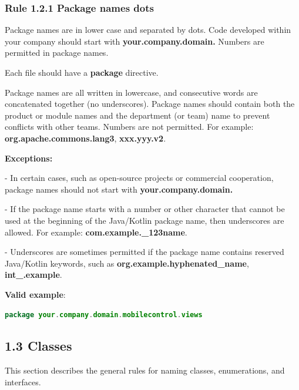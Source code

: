 \label{sec:1.2}



\subsubsection*{\textbf{Rule 1.2.1 Package names dots}}
\leavevmode\newline

\label{sec:}

Package names are in lower case and separated by dots. Code developed within your company should start with \textbf{your.company.domain.} Numbers are permitted in package names.

Each file should have a \textbf{package} directive.

Package names are all written in lowercase, and consecutive words are concatenated together (no underscores). Package names should contain both the product or module names and the department (or team) name to prevent conflicts with other teams.  Numbers are not permitted. For example: \textbf{org.apache.commons.lang3}, \textbf{xxx.yyy.v2}.



\textbf{Exceptions:} 



- In certain cases, such as open-source projects or commercial cooperation, package names should not start with \textbf{your.company.domain.}

- If the package name starts with a number or other character that cannot be used at the beginning of the Java/Kotlin package name, then underscores are allowed. For example: \textbf{com.example.\_123name}.

- Underscores are sometimes permitted if the package name contains reserved Java/Kotlin keywords, such as \textbf{org.example.hyphenated\_name}, \textbf{int\_.example}.



\textbf{Valid example}: 

\begin{lstlisting}[language=Kotlin]
package your.company.domain.mobilecontrol.views
\end{lstlisting}


\subsection*{\textbf{1.3 Classes}}

\label{sec:1.3}

This section describes the general rules for naming classes, enumerations, and interfaces.

